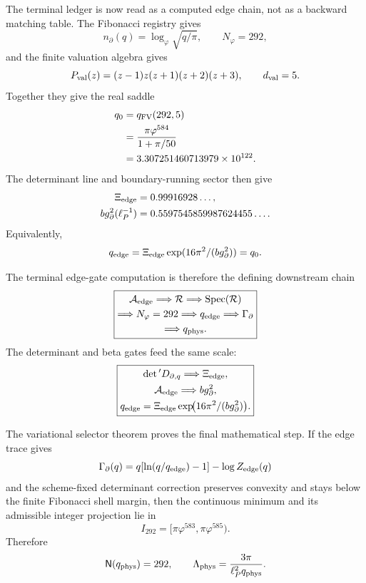 \documentclass[aps,prd,reprint,nofootinbib,superscriptaddress,floatfix]{revtex4-2}
\numberwithin{equation}{section}
\theoremstyle{definition}
\theoremstyle{plain}
\begin{document}
The terminal ledger is now read as a computed edge chain, not as a backward
matching table.  The Fibonacci registry gives
\[
n_\partial(q)=\log_\varphi\sqrt{q/\pi},
\qquad
N_\varphi=292,
\]
and the finite valuation algebra gives
\[
P_{\rm val}(z)=(z-1)z(z+1)(z+2)(z+3),
\qquad
d_{\rm val}=5.
\]
Together they give the real saddle
\[
\begin{aligned}
q_0
&=
q_{\rm FV}(292,5)\\
&=
\frac{\pi\varphi^{584}}{1+\pi/50}\\
&=
3.307251460713979\times10^{122}.
\end{aligned}
\]
The determinant line and boundary-running sector then give
\[
\begin{aligned}
\Xi_{\rm edge}&=0.99916928\ldots,\\
b g_\partial^2(\ell_P^{-1})
&=0.5597545859987624455\ldots .
\end{aligned}
\]
Equivalently,
\[
q_{\rm edge}
=
\Xi_{\rm edge}\exp(16\pi^2/(b g_\partial^2))
=
q_0.
\]

The terminal edge-gate computation is therefore the defining downstream chain
\[
\boxed{
\begin{gathered}
\mathcal A_{\rm edge}\Longrightarrow\mathcal R
\Longrightarrow\operatorname{Spec}(\mathcal R)\\
\Longrightarrow N_\varphi=292
\Longrightarrow q_{\rm edge}
\Longrightarrow\Gamma_\partial\\
\Longrightarrow q_{\rm phys}.
\end{gathered}
}
\]
The determinant and beta gates feed the same scale:
\[
\boxed{
\begin{gathered}
\det{}'D_{\partial,q}\Longrightarrow\Xi_{\rm edge},\\
\mathcal A_{\rm edge}\Longrightarrow b g_\partial^2,\\
q_{\rm edge}
=
\Xi_{\rm edge}
\exp\!\bigl(16\pi^2/(b g_\partial^2)\bigr).
\end{gathered}
}
\]

The variational selector theorem proves the final mathematical step.  If the
edge trace gives
\[
\Gamma_\partial(q)
=
q[\ln(q/q_{\rm edge})-1]-\log Z_{\rm edge}(q)
\]
and the scheme-fixed determinant correction preserves convexity and stays below
the finite Fibonacci shell margin, then the continuous minimum and its
admissible integer projection lie in
\[
I_{292}=[\pi\varphi^{583},\pi\varphi^{585}).
\]
Therefore
\[
\mathsf N(q_{\rm phys})=292,
\qquad
\Lambda_{\rm phys}=\frac{3\pi}{\ell_P^2q_{\rm phys}}.
\]
\end{document}
